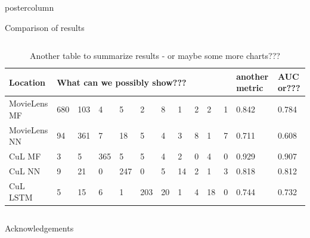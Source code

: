 \documentclass[final,hyperref={pdfpagelabels=false}]{beamer}
\begin{document}
\begin{frame}
\begin{columns}
\begin{column}{.49\paperwidth}
\begin{beamercolorbox}[center,wd=\textwidth]{postercolumn}
\begin{minipage}[T]{.99\textwidth}
{
\vfill	

\begin{block}{Comparison of results}

\begin{columns}
\begin{column}{1\textwidth}

\centering

\centering
\begin{minipage}[t]{.95\textwidth}


\vspace{-1cm}
\begin{table}[h]
\footnotesize
\caption{Another table to summarize results - or maybe some more charts???}
\begin{tabular}{p{8cm}p{2cm}p{2cm}p{2cm}p{2cm}p{2cm}p{2cm}p{2cm}p{2cm}p{2cm}p{2cm}p{2.5cm}p{2.5cm}}
\toprule
Location      & \multicolumn{10}{l}{What can we possibly show???}        & another metric & AUC or??? \\
\midrule
MovieLens MF          & 680 & 103 & 4   & 5   & 2   & 8   & 1   & 2  & 2 & 1 & 0.842 & 0.784 \\
MovieLens NN         & 94  & 361 &  7  & 18  & 5   & 4   & 3   & 8  & 1 & 7 & 0.711 & 0.608 \\
CuL MF    & 3   & 5   & 365 &  5  & 5   & 4   & 2   & 0  & 4 & 0 & 0.929 & 0.907 \\
CuL NN     & 9   & 21  & 0   & 247 &  0  & 5   & 14  & 2  & 1 & 3 & 0.818 & 0.812 \\
CuL LSTM     & 5   & 15  & 6   & 1   & 203 & 20  & 1   & 4  & 18& 0 & 0.744 & 0.732 \\
\bottomrule

\end{tabular}
\end{table}


\end{minipage}

\end{column}
\end{columns}
\end{block}

\vfill


\begin{block}{Acknowledgements}
\centering
\begin{minipage}[t]{0.98\textwidth}


\end{minipage}
\end{block}}
\end{minipage}
\end{beamercolorbox}
\end{column}
\end{columns}
\end{frame}
\end{document}
